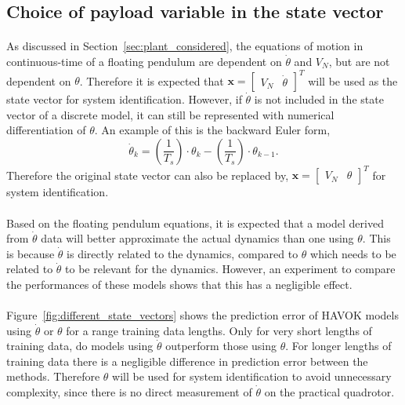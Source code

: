     \subsection{Choice of payload variable in the state vector}

        \paragraph{}
        As discussed in Section~\ref{sec:plant_considered}, 
        the equations of motion in continuous-time of a floating pendulum are dependent on $\dot{\theta}$ and $V_N$, 
        but are not dependent on $\theta$.
        Therefore it is expected that 
        $
        \bm{x} = \begin{bmatrix}
            V_N & \dot{\theta}
        \end{bmatrix}^T
        $
        will be used as the state vector for system identification.
        However, if $\dot{\theta}$ is not included in the state vector of a discrete model, 
        it can still be represented with numerical differentiation of $\theta$.
        An example of this is the backward Euler form,
        \begin{equation}
            \dot{\theta}_k = (\frac{1}{T_s}) \cdot \theta_k - (\frac{1}{T_s}) \cdot \theta_{k-1} .
        \end{equation}
        Therefore the original state vector can also be replaced by,
        $
            \bm{x} = \begin{bmatrix}
                V_N & \theta
            \end{bmatrix}^T
        $
        for system identification.

        \paragraph{}
        Based on the floating pendulum equations, it is expected that a model derived from $\dot{\theta}$ data 
        will better approximate the actual dynamics than one using $\theta$.
        This is because $\dot{\theta}$ is directly related to the dynamics, 
        compared to $\theta$ which needs to be related to $\dot{\theta}$ to be relevant for the dynamics.
        However, an experiment to compare the performances of these models shows that this has a  negligible effect.

        

        \paragraph{}
        Figure~\ref{fig:different_state_vectors} shows the prediction error of HAVOK models using $\dot{\theta}$ or $\theta$ 
        for a range training data lengths.
        Only for very short lengths of training data, do models using $\dot{\theta}$ outperform those using $\theta$.
        For longer lengths of training data there is a negligible difference in prediction error between the methods.
        Therefore $\theta$ will be used for system identification to avoid unnecessary complexity, 
        since there is no direct measurement of $\dot{\theta}$ on the practical quadrotor.

